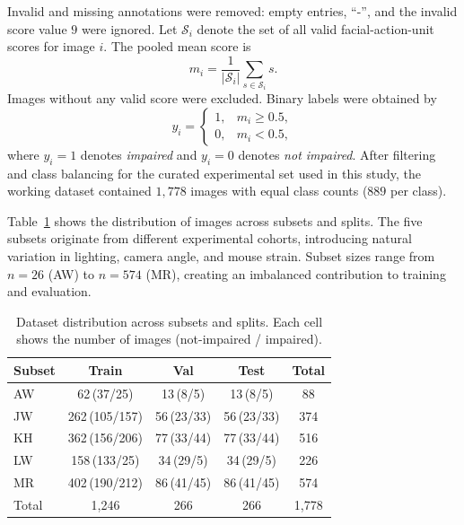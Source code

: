 \documentclass[sigconf]{acmart}
\begin{document}
Invalid and missing annotations were removed: empty entries, ``-'', and the
invalid score value $9$ were ignored. Let $\mathcal{S}_i$ denote the set of
all valid facial-action-unit scores for image $i$. The pooled mean score is
\begin{equation}
    m_i =
    \frac{1}{|\mathcal{S}_i|}
    \sum_{s \in \mathcal{S}_i} s.
\end{equation}
Images without any valid score were excluded. Binary labels were obtained by
\begin{equation}
    y_i =
    \begin{cases}
        1, & m_i \geq 0.5,\\
        0, & m_i < 0.5,
    \end{cases}
\end{equation}
where $y_i=1$ denotes \textit{impaired} and $y_i=0$ denotes \textit{not
impaired}. After filtering and class balancing for the curated experimental
set used in this study, the working dataset contained $1{,}778$ images with
equal class counts ($889$ per class).

Table~\ref{tab:dataset} shows the distribution of images across subsets and
splits. The five subsets originate from different experimental cohorts,
introducing natural variation in lighting, camera angle, and mouse strain.
Subset sizes range from $n=26$ (AW) to $n=574$ (MR), creating an
imbalanced contribution to training and evaluation.

\begin{table}[t]
  \centering
  \caption{Dataset distribution across subsets and splits. Each cell shows the
  number of images (not-impaired / impaired).}
  \label{tab:dataset}
  \small
  \begin{tabular}{lccc|c}
    \toprule
    Subset & Train & Val & Test & Total \\
    \midrule
    AW & 62\,(37/25)  & 13\,(8/5)   & 13\,(8/5)   & 88  \\
    JW & 262\,(105/157) & 56\,(23/33) & 56\,(23/33) & 374 \\
    KH & 362\,(156/206) & 77\,(33/44) & 77\,(33/44) & 516 \\
    LW & 158\,(133/25)  & 34\,(29/5)  & 34\,(29/5)  & 226 \\
    MR & 402\,(190/212) & 86\,(41/45) & 86\,(41/45) & 574 \\
    \midrule
    Total & 1{,}246 & 266 & 266 & 1{,}778 \\
    \bottomrule
  \end{tabular}
\end{table}
\end{document}
